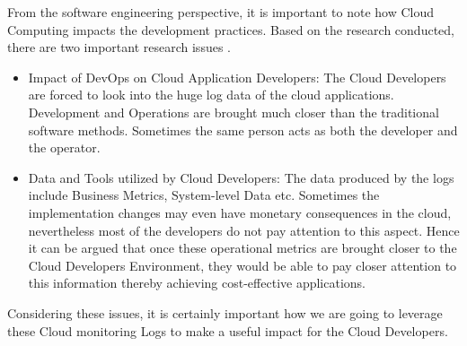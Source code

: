 \documentclass[article,type=msc,colorback,12pt,accentcolor=tud7b]{tudthesis}
\begin{document}
%	
%	
%	
	
From the software engineering perspective, it is important to note how Cloud Computing impacts the development practices. Based on the research conducted, there are two important research issues \cite{cito2014making}. 

\begin{itemize}

	
	\item Impact of DevOps on Cloud Application Developers:	
	The Cloud Developers are forced to look into the huge log data of the cloud applications. Development and Operations are brought much closer than the traditional software methods. Sometimes the same person acts as both the developer and the operator. 
	
	\item Data and Tools utilized by Cloud Developers:
	The data produced by the logs include Business Metrics, System-level Data etc. Sometimes the implementation changes may even have monetary consequences in the cloud, nevertheless most of the developers do not pay attention to this aspect. Hence it can be argued that once these operational metrics are brought closer to the Cloud Developers Environment, they would be able to pay closer attention to this information thereby achieving cost-effective applications.
	
\end{itemize}

Considering these issues, it is certainly important how we are going to leverage these Cloud monitoring Logs to make a useful impact for the Cloud Developers. 
 
\end{document}
